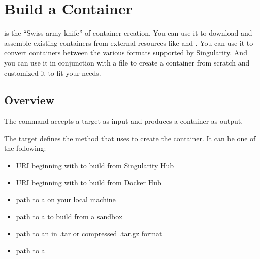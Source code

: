\documentclass[letterpaper,10pt,english]{sphinxmanual}
\begin{document}
\chapter{Build a Container}
\label{\detokenize{build_a_container:build-a-container}}\label{\detokenize{build_a_container:id1}}\label{\detokenize{build_a_container::doc}}\label{\detokenize{build_a_container:sec-buildcontainer}}
 is the “Swiss army knife” of container creation. You can use it to
download and assemble existing containers from external resources like
 and . You can use it to convert
containers between the various formats supported by Singularity. And you
can use it in conjunction with a {\hyperref[\detokenize{container_recipes:container-recipes}]{}} file to
create a container from scratch and customized it to fit your needs.


\section{Overview}
\label{\detokenize{build_a_container:overview}}
The  command accepts a target as input and produces a container as output.

The target defines the method that  uses to create the container. It
can be one of the following:
\begin{itemize}
\item {} 
URI beginning with  to build from Singularity Hub

\item {} 
URI beginning with  to build from Docker Hub

\item {} 
path to a  on your local machine

\item {} 
path to a  to build from a sandbox

\item {} 
path to an  in .tar or compressed .tar.gz format

\item {} 
path to a {\hyperref[\detokenize{container_recipes:container-recipes}]{}}

\end{itemize}
\end{document}
